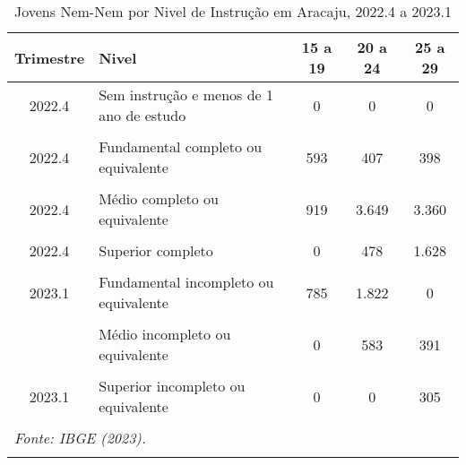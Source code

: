 \documentclass[preprint, 3p,
authoryear]{elsarticle} %
\begin{document}
\begin{longtable}[t]{clccc}
\caption{\label{tab:tab10}\label{tab10}Jovens Nem-Nem por Nivel de Instrução em Aracaju, 2022.4 a 2023.1}\\
\toprule
Trimestre & Nivel & 15 a 19 & 20 a 24 & 25 a 29\\
\midrule
2022.4 & Sem instrução e menos de 1 ano de estudo & 0 & 0 & 0\\
\cellcolor[HTML]{DCDCDC}{2022.4} & \cellcolor[HTML]{DCDCDC}{Fundamental incompleto ou equivalente} & \cellcolor[HTML]{DCDCDC}{1.166} & \cellcolor[HTML]{DCDCDC}{1.159} & \cellcolor[HTML]{DCDCDC}{363}\\
2022.4 & Fundamental completo ou equivalente & 593 & 407 & 398\\
\cellcolor[HTML]{DCDCDC}{2022.4} & \cellcolor[HTML]{DCDCDC}{Médio incompleto ou equivalente} & \cellcolor[HTML]{DCDCDC}{698} & \cellcolor[HTML]{DCDCDC}{798} & \cellcolor[HTML]{DCDCDC}{868}\\
2022.4 & Médio completo ou equivalente & 919 & 3.649 & 3.360\\
\addlinespace
\cellcolor[HTML]{DCDCDC}{2022.4} & \cellcolor[HTML]{DCDCDC}{Superior incompleto ou equivalente} & \cellcolor[HTML]{DCDCDC}{0} & \cellcolor[HTML]{DCDCDC}{764} & \cellcolor[HTML]{DCDCDC}{475}\\
2022.4 & Superior completo & 0 & 478 & 1.628\\
\cellcolor[HTML]{DCDCDC}{2023.1} & \cellcolor[HTML]{DCDCDC}{Sem instrução e menos de 1 ano de estudo} & \cellcolor[HTML]{DCDCDC}{0} & \cellcolor[HTML]{DCDCDC}{873} & \cellcolor[HTML]{DCDCDC}{0}\\
2023.1 & Fundamental incompleto ou equivalente & 785 & 1.822 & 0\\
\cellcolor[HTML]{DCDCDC}{2023.1} & \cellcolor[HTML]{DCDCDC}{Fundamental completo ou equivalente} & \cellcolor[HTML]{DCDCDC}{0} & \cellcolor[HTML]{DCDCDC}{0} & \cellcolor[HTML]{DCDCDC}{0}\\
\addlinespace
2023.1 & Médio incompleto ou equivalente & 0 & 583 & 391\\
\cellcolor[HTML]{DCDCDC}{2023.1} & \cellcolor[HTML]{DCDCDC}{Médio completo ou equivalente} & \cellcolor[HTML]{DCDCDC}{2.255} & \cellcolor[HTML]{DCDCDC}{3.359} & \cellcolor[HTML]{DCDCDC}{2.817}\\
2023.1 & Superior incompleto ou equivalente & 0 & 0 & 305\\
\cellcolor[HTML]{DCDCDC}{2023.1} & \cellcolor[HTML]{DCDCDC}{Superior completo} & \cellcolor[HTML]{DCDCDC}{0} & \cellcolor[HTML]{DCDCDC}{149} & \cellcolor[HTML]{DCDCDC}{263}\\
\bottomrule
\multicolumn{5}{l}{\rule{0pt}{1em}\textit{Fonte: IBGE (2023).}}\\
\multicolumn{5}{l}{\rule{0pt}{1em}}\\
\end{longtable}
\endgroup{}
\end{document}
